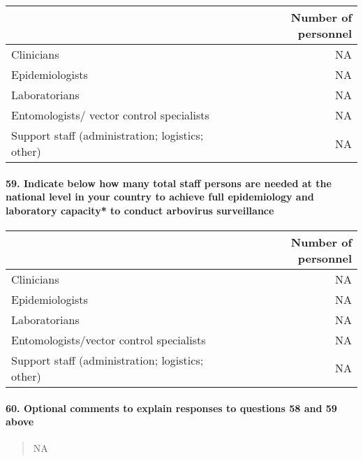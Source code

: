 \documentclass[
]{article}
\begin{document}
\begin{longtable}[]{@{}lr@{}}
\toprule
& Number of personnel \\
\midrule
\endhead
Clinicians & NA \\
Epidemiologists & NA \\
Laboratorians & NA \\
Entomologists/ vector control specialists & NA \\
Support staff (administration; logistics; other) & NA \\
\bottomrule
\end{longtable}

\hypertarget{indicate-below-how-many-total-staff-persons-are-needed-at-the-national-level-in-your-country-to-achieve-full-epidemiology-and-laboratory-capacity-to-conduct-arbovirus-surveillance}{%
\paragraph{59. Indicate below how many total staff persons are needed at
the national level in your country to achieve full epidemiology and
laboratory capacity* to conduct arbovirus
surveillance}\label{indicate-below-how-many-total-staff-persons-are-needed-at-the-national-level-in-your-country-to-achieve-full-epidemiology-and-laboratory-capacity-to-conduct-arbovirus-surveillance}}

\begin{longtable}[]{@{}lr@{}}
\toprule
& Number of personnel \\
\midrule
\endhead
Clinicians & NA \\
Epidemiologists & NA \\
Laboratorians & NA \\
Entomologists/vector control specialists & NA \\
Support staff (administration; logistics; other) & NA \\
\bottomrule
\end{longtable}

\hypertarget{optional-comments-to-explain-responses-to-questions-58-and-59-above}{%
\paragraph{60. Optional comments to explain responses to questions 58
and 59
above}\label{optional-comments-to-explain-responses-to-questions-58-and-59-above}}

\begin{quote}
NA
\end{quote}
\end{document}
